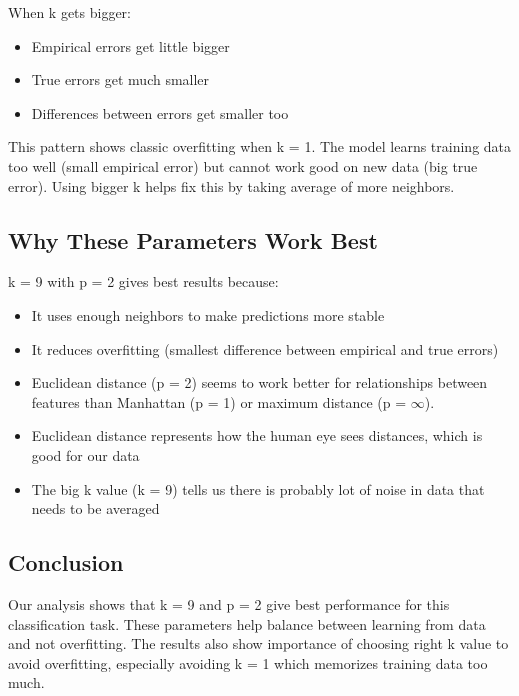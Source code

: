 \documentclass{article}
\begin{document}
When k gets bigger:
\begin{itemize}
    \item Empirical errors get little bigger
    \item True errors get much smaller
    \item Differences between errors get smaller too
\end{itemize}

This pattern shows classic overfitting when k = 1. The model learns training data too well (small empirical error) but cannot work good on new data (big true error). Using bigger k helps fix this by taking average of more neighbors.

\subsection{Why These Parameters Work Best}
k = 9 with p = 2 gives best results because:
\begin{itemize}
    \item It uses enough neighbors to make predictions more stable
    \item It reduces overfitting (smallest difference between empirical and true errors)
    \item Euclidean distance (p = 2) seems to work better for relationships between features than Manhattan (p = 1) or maximum distance (p = $\infty$).
    \item Euclidean distance represents how the human eye sees distances, which is good for our data
    \item The big k value (k = 9) tells us there is probably lot of noise in data that needs to be averaged
\end{itemize}

\subsection{Conclusion}
Our analysis shows that k = 9 and p = 2 give best performance for this classification task. These parameters help balance between learning from data and not overfitting. The results also show importance of choosing right k value to avoid overfitting, especially avoiding k = 1 which memorizes training data too much.
\end{document}
